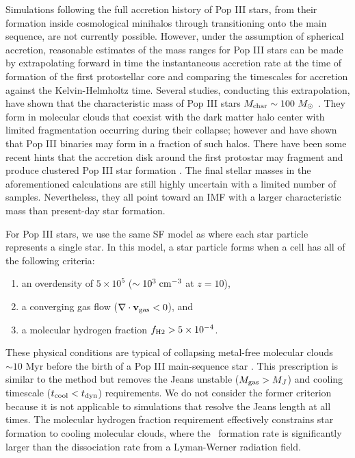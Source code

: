 \documentclass[apj]{emulateapj}
\begin{document}
Simulations following the full accretion history of Pop III stars,
from their formation inside cosmological minihalos through
transitioning onto the main sequence, are not currently possible.
However, under the assumption of spherical accretion, reasonable
estimates of the mass ranges for Pop III stars can be made by
extrapolating forward in time the instantaneous accretion rate at the
time of formation of the first protostellar core and comparing the
timescales for accretion against the Kelvin-Helmholtz time.  Several
studies, conducting this extrapolation, have shown that the
characteristic mass of Pop III stars $M_{\rm char} \sim 100~\Ms$
\citep{ABN02, Bromm02_P3, OShea07a, Yoshida08}.  They form in
molecular clouds that coexist with the dark matter halo center with
limited fragmentation occurring during their collapse; however
\citet{2009Sci...325..601T} and \citet{Stacy10_Binary} have shown that
Pop III binaries may form in a fraction of such halos.  There have
been some recent hints that the accretion disk around the first
protostar may fragment and produce clustered Pop III star formation
\citep{Clark11_Frag, Greif11_P3Cluster}.  The final stellar masses in
the aforementioned calculations are still highly uncertain with a
limited number of samples.  Nevertheless, they all point toward an IMF
with a larger characteristic mass than present-day star formation.


For Pop III stars, we use the same SF model as \citet{Wise08_Gal}
where each star particle represents a single star.  In this model, a
star particle forms when a cell has all of the following criteria:
%
\begin{enumerate}
\item an overdensity of $5 \times 10^5$ ($\sim 10^3\; \cubecm$ at
  $z=10$),
\item a converging gas flow ($\nabla \cdot \mathbf{v}_{\rm gas} < 0$),
  and
\item a molecular hydrogen fraction $f_{\rm H2} > 5 \times 10^{-4}$.
\end{enumerate}
%
These physical conditions are typical of collapsing metal-free
molecular clouds $\sim 10$ Myr before the birth of a Pop III
main-sequence star \citep{ABN02, OShea07a}.  This prescription is
similar to the \citet{Cen92} method but removes the Jeans unstable
($M_{\rm gas} > M_J$) and cooling timescale ($t_{\rm cool} < t_{\rm
  dyn}$) requirements.  We do not consider the former criterion
because it is not applicable to simulations that resolve the Jeans
length at all times.  The molecular hydrogen fraction requirement
effectively constrains star formation to cooling molecular clouds,
where the \hh~formation rate is significantly larger than the
dissociation rate from a Lyman-Werner radiation field.
\end{document}
